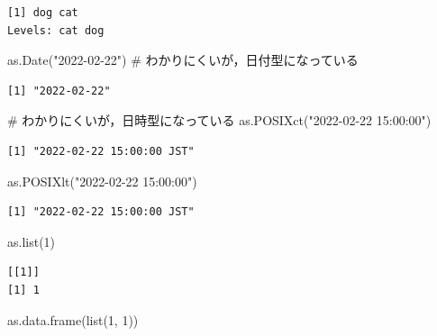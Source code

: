 \documentclass[
  letterpaper,
  DIV=11,
  numbers=noendperiod]{scrreprt}
\newenvironment{Shaded}{\begin{snugshade}}{\end{snugshade}}
\newcommand{\CommentTok}[1]{\textcolor[rgb]{0.37,0.37,0.37}{#1}}
\newcommand{\DecValTok}[1]{\textcolor[rgb]{0.68,0.00,0.00}{#1}}
\newcommand{\FunctionTok}[1]{\textcolor[rgb]{0.28,0.35,0.67}{#1}}
\newcommand{\NormalTok}[1]{\textcolor[rgb]{0.00,0.23,0.31}{#1}}
\newcommand{\StringTok}[1]{\textcolor[rgb]{0.13,0.47,0.30}{#1}}
\begin{document}
\begin{verbatim}
[1] dog cat
Levels: cat dog
\end{verbatim}

\begin{Shaded}
\begin{Highlighting}[]
\FunctionTok{as.Date}\NormalTok{(}\StringTok{"2022{-}02{-}22"}\NormalTok{) }\CommentTok{\# わかりにくいが，日付型になっている}
\end{Highlighting}
\end{Shaded}

\begin{verbatim}
[1] "2022-02-22"
\end{verbatim}

\begin{Shaded}
\begin{Highlighting}[]
\CommentTok{\# わかりにくいが，日時型になっている}
\FunctionTok{as.POSIXct}\NormalTok{(}\StringTok{"2022{-}02{-}22 15:00:00"}\NormalTok{)}
\end{Highlighting}
\end{Shaded}

\begin{verbatim}
[1] "2022-02-22 15:00:00 JST"
\end{verbatim}

\begin{Shaded}
\begin{Highlighting}[]
\FunctionTok{as.POSIXlt}\NormalTok{(}\StringTok{"2022{-}02{-}22 15:00:00"}\NormalTok{)}
\end{Highlighting}
\end{Shaded}

\begin{verbatim}
[1] "2022-02-22 15:00:00 JST"
\end{verbatim}

\begin{Shaded}
\begin{Highlighting}[]
\FunctionTok{as.list}\NormalTok{(}\DecValTok{1}\NormalTok{)}
\end{Highlighting}
\end{Shaded}

\begin{verbatim}
[[1]]
[1] 1
\end{verbatim}

\begin{Shaded}
\begin{Highlighting}[]
\FunctionTok{as.data.frame}\NormalTok{(}\FunctionTok{list}\NormalTok{(}\DecValTok{1}\NormalTok{, }\DecValTok{1}\NormalTok{))}
\end{Highlighting}
\end{Shaded}
\end{document}
